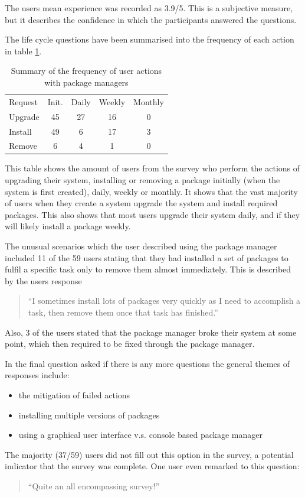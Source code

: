 The users mean experience was recorded as 3.9/5.
This is a subjective measure, but it describes the confidence in which the participants answered the questions. 

The life cycle questions have been summarised into the frequency of each action in table \ref{strat.tblaction}.

\begin{table}[htp]
\begin{tabular}{l | c | c | c | c |}
Request & Init. & Daily & Weekly & Monthly \\
Upgrade  & 45 & 27 & 16 & 0 \\
Install & 49 & 6 & 17 & 3 \\
Remove & 6 & 4 & 1 & 0\\
\end{tabular}
\caption{Summary of the frequency of user actions with package managers}
\label{strat.tblaction}
\end{table}

This table shows the amount of users from the survey who perform the actions of upgrading their system, installing or removing a package 
initially (when the system is first created), daily, weekly or monthly.
It shows that the vast majority of users when they create a system upgrade the system and install required packages.
This also shows that most users upgrade their system daily, and if they will likely install a package weekly.

The unusual scenarios which the user described using the package manager included 
11 of the 59 users stating that they had installed a set of packages to fulfil a specific task only to remove them almost immediately.
This is described by the users response 
\begin{quote}
``I sometimes install lots of packages very quickly as I need to accomplish a task, then remove them once that task has finished.''
\end{quote}

Also, 3 of the users stated that the package manager broke their system at some point, which then required to be fixed through the package manager.

In the final question asked if there is any more questions the general themes of responses include:
\begin{itemize}
  \item the mitigation of failed actions
  \item installing multiple versions of packages
  \item using a graphical user interface v.s. console based package manager
\end{itemize} 
The majority (37/59) users did not fill out this option in the survey, a potential indicator that the survey was complete.
One user even remarked to this question:
\begin{quote}
``Quite an all encompassing survey!''
\end{quote}

